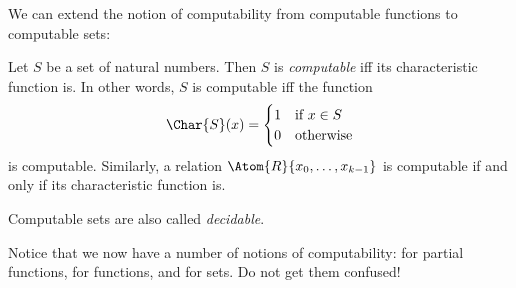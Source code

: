 \documentclass[../../../include/open-logic-section]{subfiles}
\begin{document}

We can extend the notion of computability from computable functions to
computable sets:

\begin{defn}
  Let $S$ be a set of natural numbers. Then $S$ is \emph{computable}
  iff its characteristic function is. In other words, $S$ is
  computable iff the function
\[
\Char{S}(x) =
\begin{cases}
1 & \text{if $x \in S$} \\
0 & \text{otherwise}
\end{cases}
\]
is computable. Similarly, a relation $\Atom{R}{x_0, \dots, x_{k-1}}$ is
computable if and only if its characteristic function is.
\end{defn}

\begin{explain}
Computable sets are also called \emph{decidable}.

Notice that we now have a number of notions of computability: for
partial functions, for functions, and for sets. Do not get them
confused!{} 
\end{explain}
\end{document}
